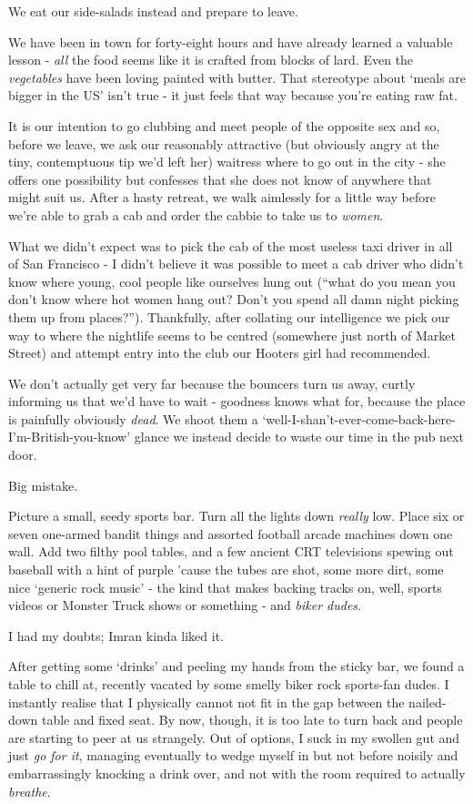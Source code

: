 \documentclass[a5paper,titlepage,11pt]{book}
\begin{document}
We eat our side-salads instead and prepare to leave.

We have been in town for forty-eight hours and have already learned a valuable lesson - \emph{all} the food seems like it is crafted from blocks of lard. Even the \emph{vegetables} have been loving painted with butter. That stereotype about `meals are bigger in the US' isn't true - it just feels that way because you're eating raw fat.

It is our intention to go clubbing and meet people of the opposite sex and so, before we leave, we ask our reasonably attractive (but obviously angry at the tiny, contemptuous tip we'd left her) waitress where to go out in the city - she offers one possibility but confesses that she does not know of anywhere that might suit us. After a hasty retreat, we walk aimlessly for a little way before we're able to grab a cab and order the cabbie to take us to \emph{women}.

What we didn't expect was to pick the cab of the most useless taxi driver in all of San Francisco - I didn't believe it was possible to meet a cab driver who didn't know where young, cool people like ourselves hung out (``what do you mean you don't know where hot women hang out?  Don't you spend all damn night picking them up from places?''). Thankfully, after collating our intelligence we pick our way to where the nightlife seems to be centred (somewhere just north of Market Street) and attempt entry into the club our Hooters girl had recommended.

We don't actually get very far because the bouncers turn us away, curtly informing us that we'd have to wait - goodness knows what for, because the place is painfully obviously \emph{dead}. We shoot them a `well-I-shan't-ever-come-back-here-I'm-British-you-know' glance we instead decide to waste our time in the pub next door.

Big mistake.

Picture a small, seedy sports bar. Turn all the lights down \emph{really} low. Place six or seven one-armed bandit things and assorted football arcade machines down one wall. Add two filthy pool tables, and a few ancient CRT televisions spewing out baseball with a hint of purple 'cause the tubes are shot, some more dirt, some nice `generic rock music' - the kind that makes backing tracks on, well, sports videos or Monster Truck shows or something - and \emph{biker dudes}.

I had my doubts; Imran kinda liked it.

After getting some `drinks' and peeling my hands from the sticky bar, we found a table to chill at, recently vacated by some smelly biker rock sports-fan dudes. I instantly realise that I physically cannot not fit in the gap between the nailed-down table and fixed seat. By now, though, it is too late to turn back and people are starting to peer at us strangely. Out of options, I suck in my swollen gut and just \emph{go for it}, managing eventually to wedge myself in but not before noisily and embarrassingly knocking a drink over, and not with the room required to actually \emph{breathe}.
\end{document}
